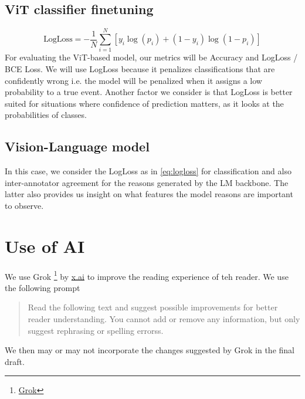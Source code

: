 \documentclass[10pt,twocolumn,letterpaper]{article}
\begin{document}
\subsection{ViT classifier finetuning}
\begin{equation}
\text{LogLoss} = - \frac{1}{N} \sum_{i=1}^{N}[y_{i}\log(p_i) + (1 - y_{i}) \log(1 - p_i)]
\label{eq:logloss}
\end{equation}
For evaluating the ViT-based model, our metrics will be Accuracy and LogLoss / BCE Loss. We will use LogLoss because it penalizes classifications that are confidently wrong i.e. the model will be penalized when it assigns a low probability to a true event. Another factor we consider is that LogLoss is better suited for situations where confidence of prediction matters, as it looks at the probabilities of classes.

\subsection{Vision-Language model}
In this case, we consider the LogLoss as in \ref{eq:logloss} for classification and also inter-annotator agreement for the reasons generated by the LM backbone. The latter also provides us insight on what features the model reasons are important to observe. 

\section*{Use of AI}
We use Grok \footnote{\href{www.grok.com}{Grok}} by \url{x.ai} to improve the reading experience of teh reader. We use the following prompt 

\begin{quote}
	Read the following text and suggest possible improvements for better reader understanding. You cannot add or remove any information, but only suggest rephrasing or spelling errorss.
\end{quote}

We then may or may not incorporate the changes suggested by Grok in the final draft.
{\small


}
\end{document}
